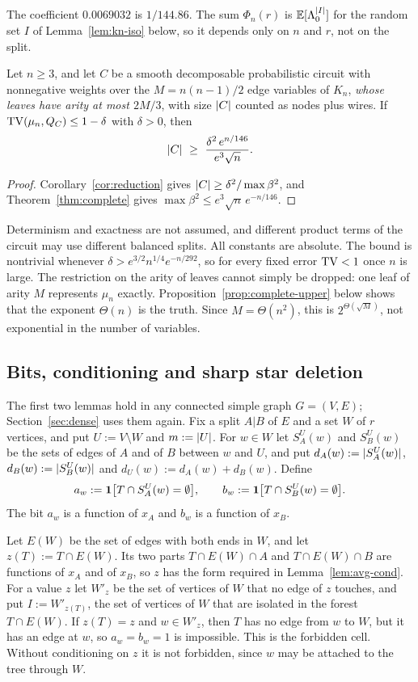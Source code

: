 The coefficient $0.0069032$ is $1/144.86$. The sum $\Phi_n(r)$ is $\mathbb{E}[\Lambda_0^{\lvert I\rvert}]$ for the random set $I$ of Lemma~\ref{lem:kn-iso} below, so it depends only on $n$ and $r$, not on the split.

\begin{corollary}\label{cor:complete}
Let $n\ge3$, and let $C$ be a smooth decomposable probabilistic circuit with nonnegative weights over the $M=n(n-1)/2$ edge variables of $K_n$, \emph{whose leaves have arity at most $2M/3$}, with size $\lvert C\rvert$ counted as nodes plus wires. If $\mathrm{TV}(\mu_n,Q_C)\le1-\delta$ with $\delta>0$, then
\[
  \abs C\ \ge\ \frac{\delta^2\,e^{n/146}}{e^3\sqrt n} .
\]
\end{corollary}

\begin{proof}
Corollary~\ref{cor:reduction} gives $\lvert C\rvert\ge\delta^2/\max\beta^2$, and Theorem~\ref{thm:complete} gives $\max\beta^2\le e^3\sqrt n\,e^{-n/146}$.
\end{proof}

Determinism and exactness are not assumed, and different product terms of the circuit may use different balanced splits. All constants are absolute. The bound is nontrivial whenever $\delta>e^{3/2}n^{1/4}e^{-n/292}$, so for every fixed error $\mathrm{TV}<1$ once $n$ is large. The restriction on the arity of leaves cannot simply be dropped: one leaf of arity $M$ represents $\mu_n$ exactly. Proposition~\ref{prop:complete-upper} below shows that the exponent $\Theta(n)$ is the truth. Since $M=\Theta(n^2)$, this is $2^{\Theta(\sqrt M)}$, not exponential in the number of variables.

\subsection{Bits, conditioning and sharp star deletion}

The first two lemmas hold in any connected simple graph $G=(V,E)$; Section~\ref{sec:dense} uses them again. Fix a split $A|B$ of $E$ and a set $W$ of $r$ vertices, and put $U:=V\setminus W$ and $m:=\lvert U\rvert$. For $w\in W$ let $S^U_A(w)$ and $S^U_B(w)$ be the sets of edges of $A$ and of $B$ between $w$ and $U$, and put $d_A(w):=\lvert S^U_A(w)\rvert$, $d_B(w):=\lvert S^U_B(w)\rvert$ and $d_U(w):=d_A(w)+d_B(w)$. Define
\[
  a_w:=\mathbf{1}\bigl[T\cap S^U_A(w)=\emptyset\bigr],\qquad b_w:=\mathbf{1}\bigl[T\cap S^U_B(w)=\emptyset\bigr].
\]
The bit $a_w$ is a function of $x_A$ and $b_w$ is a function of $x_B$.

Let $E(W)$ be the set of edges with both ends in $W$, and let $z(T):=T\cap E(W)$. Its two parts $T\cap E(W)\cap A$ and $T\cap E(W)\cap B$ are functions of $x_A$ and of $x_B$, so $z$ has the form required in Lemma~\ref{lem:avg-cond}. For a value $z$ let $W'_z$ be the set of vertices of $W$ that no edge of $z$ touches, and put $I:=W'_{z(T)}$, the set of vertices of $W$ that are isolated in the forest $T\cap E(W)$. If $z(T)=z$ and $w\in W'_z$, then $T$ has no edge from $w$ to $W$, but it has an edge at $w$, so $a_w=b_w=1$ is impossible. This is the forbidden cell. Without conditioning on $z$ it is not forbidden, since $w$ may be attached to the tree through $W$.

